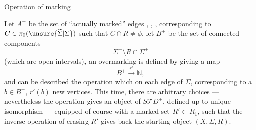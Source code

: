  
\uline{Operation} \uline{of}  \uline{marking}

Let $A^+$ be the set of ``actually marked'' edges , ,
,
corresponding to $C\in\pi_0(\unsure{\widetilde\Sigma|\Sigma})$ such that $C\cap R\ne\phi$, let $B^+$ be the set of connected components 
\[
 \Sigma^+\setminus R\cap\Sigma^+
\]
(which are open intervals), an overmarking is defined by giving a map
\[
 B^+\xrightarrow{r'}\mathbb N,
\]
and can be described   the operation which on each
\uline{edge} 
of $\Sigma$, corresponding to a $b\in B^+$, $r'(b)$ new   vertices.
This time,  there are arbitrary choices --- nevertheless the operation gives an object  of $S\mathcal TD^+$, defined up to unique isomorphism --- equipped of course with a marked set $R'\subset R_1$, such that the inverse operation of erasing $R'$ gives back the starting object $(X,\Sigma,R)$.

